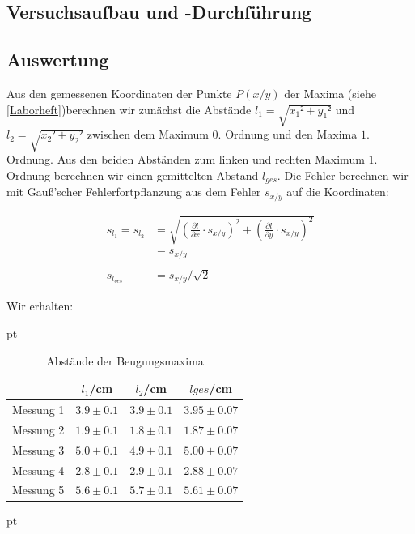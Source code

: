 \documentclass[12pt]{article}
\newcommand{\del}[2][]{\frac{\partial #1}{\partial #2}}
\begin{document}
\newpage
\subsection{Versuchsaufbau und -Durchführung}





\newpage
\subsection{Auswertung}

Aus den gemessenen Koordinaten der Punkte $P(x/y)$ der Maxima (siehe \ref{Laborheft})berechnen wir zunächst die Abstände $l_1 = \sqrt{x_1²+y_1²}$ und $l_2= \sqrt{x_2²+y_2²} $ zwischen dem Maximum $0.$ Ordnung und den Maxima $1.$ Ordnung. Aus den beiden Abständen zum linken und rechten Maximum $1.$ Ordnung berechnen wir einen gemittelten Abstand $l_{ges}$. Die Fehler berechnen wir mit Gauß'scher Fehlerfortpflanzung aus dem Fehler $s_{x/y}$ auf die Koordinaten:

\begin{align*}
s_{l_1} = s_{l_2} &= \sqrt{\left(\del[l]{x}\cdot s_{x/y}\right)^2+\left(\del[l]{y}\cdot s_{x/y}\right)^2}\\
&= s_{x/y}\\
\  \\
s_{l_{ges}} &= s_{x/y}/\sqrt{2}
\end{align*}

Wir erhalten:

  pt
 \begin{table}[h!]
 {\centering{}
\begin{tabular}{c||c|c|c}
 					& $l_1$/cm 	& $l_2$/cm & $l{ges}$/cm	\\ \hline\hline
Messung 1		& $3.9 \pm 0.1$ 	&  $3.9 \pm 0.1$    	&  $3.95 \pm 0.07$ \\ \hline 
Messung 2	&	 $1.9 \pm 0.1$ 	   	&  $1.8 \pm 0.1$  	&  $1.87 \pm 0.07$  \\ \hline
Messung 3      	&  $5.0 \pm 0.1$  	&  $4.9 \pm 0.1$  &  $5.00 \pm 0.07$  \\ \hline
Messung 4    & $2.8 \pm 0.1$ & $2.9 \pm 0.1$ &   $2.88 \pm 0.07$        \\ \hline                                           
Messung 5  & $5.6 \pm 0.1$  & $5.7 \pm 0.1$ & $5.61 \pm 0.07$
 \end{tabular}}
 \caption{Abstände der Beugungsmaxima}
\end{table}
 pt
\end{document}
